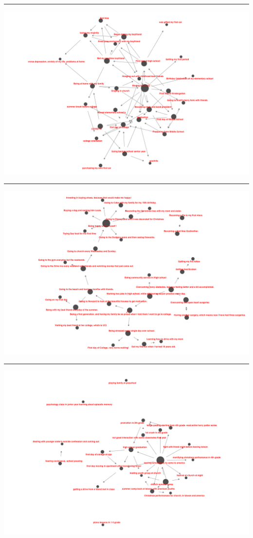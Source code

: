 \documentclass[
  .7em,
  letterpaper,
  DIV=11,
  numbers=noendperiod]{scrartcl}
\begin{document}
\begin{center}\rule{0.5\linewidth}{0.5pt}\end{center}

\includegraphics{images/60928_net.png}

\begin{center}\rule{0.5\linewidth}{0.5pt}\end{center}

\includegraphics{images/60950_net.png}

\begin{center}\rule{0.5\linewidth}{0.5pt}\end{center}

\includegraphics{images/61024_net.png}
\end{document}
